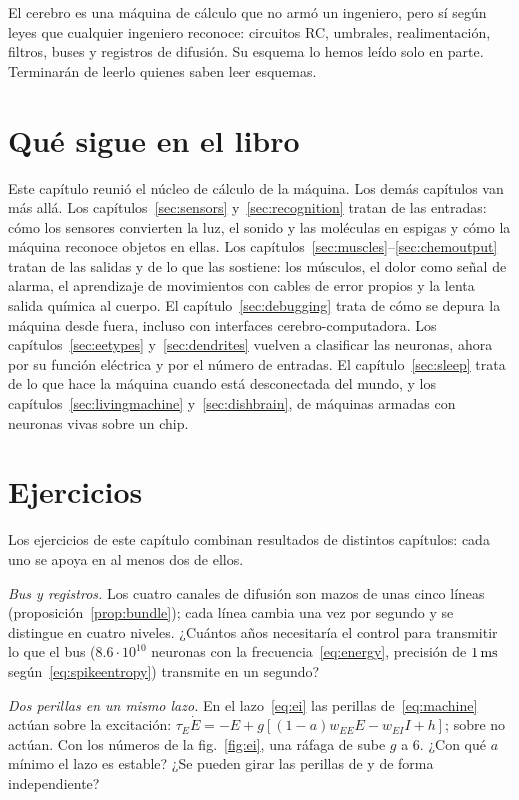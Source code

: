 El cerebro es una máquina de cálculo que no armó un ingeniero, pero sí según leyes que cualquier ingeniero reconoce: circuitos RC, umbrales, realimentación, filtros, buses y registros de difusión. Su esquema lo hemos leído solo en parte. Terminarán de leerlo quienes saben leer esquemas.

\section{Qué sigue en el libro}

Este capítulo reunió el núcleo de cálculo de la máquina. Los demás capítulos van más allá. Los capítulos~\ref{sec:sensors} y~\ref{sec:recognition} tratan de las entradas: cómo los sensores convierten la luz, el sonido y las moléculas en espigas y cómo la máquina reconoce objetos en ellas. Los capítulos~\ref{sec:muscles}--\ref{sec:chemoutput} tratan de las salidas y de lo que las sostiene: los músculos, el dolor como señal de alarma, el aprendizaje de movimientos con cables de error propios y la lenta salida química al cuerpo. El capítulo~\ref{sec:debugging} trata de cómo se depura la máquina desde fuera, incluso con interfaces cerebro-computadora. Los capítulos~\ref{sec:eetypes} y~\ref{sec:dendrites} vuelven a clasificar las neuronas, ahora por su función eléctrica y por el número de entradas. El capítulo~\ref{sec:sleep} trata de lo que hace la máquina cuando está desconectada del mundo, y los capítulos~\ref{sec:livingmachine} y~\ref{sec:dishbrain}, de máquinas armadas con neuronas vivas sobre un chip.

\section{Ejercicios}

Los ejercicios de este capítulo combinan resultados de distintos capítulos: cada uno se apoya en al menos dos de ellos.

\begin{exercise}[\lvlA]
\label{ex:10:1}
\emph{Bus y registros.} Los cuatro canales de difusión son mazos de unas cinco líneas (proposición~\ref{prop:bundle}); cada línea cambia una vez por segundo y se distingue en cuatro niveles. ¿Cuántos años necesitaría el control para transmitir lo que el bus  ($8.6\cdot10^{10}$ neuronas con la frecuencia~\eqref{eq:energy}, precisión de $1\,\text{ms}$ según~\eqref{eq:spikeentropy}) transmite en un segundo?
\end{exercise}

\begin{exercise}[\lvlB]
\label{ex:10:2}
\emph{Dos perillas en un mismo lazo.} En el lazo~\eqref{eq:ei} las perillas de~\eqref{eq:machine} actúan sobre la excitación: $\tau_E\dot E=-E+g[(1-a)w_{EE}E-w_{EI}I+h]$; sobre  no actúan. Con los números de la fig.~\ref{fig:ei}, una ráfaga de  sube $g$ a $6$. ¿Con qué $a$ mínimo el lazo es estable? ¿Se pueden girar las perillas de  y  de forma independiente?
\end{exercise}

